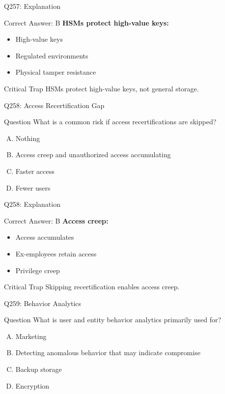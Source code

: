 \documentclass{beamer}
\begin{document}
	\begin{frame}{Q257: Explanation}
		\begin{block}{Correct Answer: B}
			\textbf{HSMs protect high-value keys:}
			\begin{itemize}
				\item High-value keys
				\item Regulated environments
				\item Physical tamper resistance
			\end{itemize}
		\end{block}
		\begin{alertblock}{Critical Trap}
			HSMs protect high-value keys, not general storage.
		\end{alertblock}
	\end{frame}
	
	\begin{frame}{Q258: Access Recertification Gap}
		\begin{block}{Question}
			What is a common risk if access recertifications are skipped?
		\end{block}
		\begin{enumerate}[(A)]
			\item Nothing
			\item Access creep and unauthorized access accumulating
			\item Faster access
			\item Fewer users
		\end{enumerate}
	\end{frame}
	
	\begin{frame}{Q258: Explanation}
		\begin{block}{Correct Answer: B}
			\textbf{Access creep:}
			\begin{itemize}
				\item Access accumulates
				\item Ex-employees retain access
				\item Privilege creep
			\end{itemize}
		\end{block}
		\begin{alertblock}{Critical Trap}
			Skipping recertification enables access creep.
		\end{alertblock}
	\end{frame}
	
	\begin{frame}{Q259: Behavior Analytics}
		\begin{block}{Question}
			What is user and entity behavior analytics primarily used for?
		\end{block}
		\begin{enumerate}[(A)]
			\item Marketing
			\item Detecting anomalous behavior that may indicate compromise
			\item Backup storage
			\item Encryption
		\end{enumerate}
	\end{frame}
	
\end{document}
